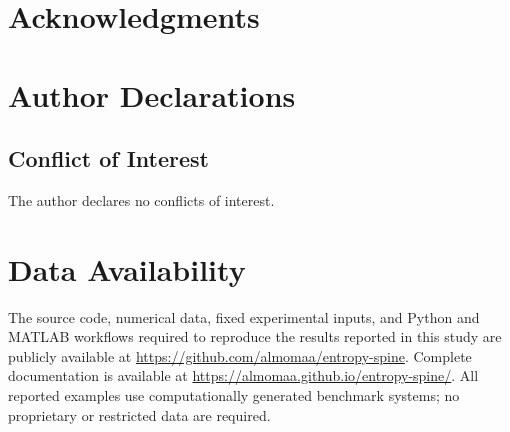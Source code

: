 \documentclass[aip,cha,reprint,superscriptaddress,floatfix]{revtex4-2}
\theoremstyle{definition}
\theoremstyle{remark}
\begin{document}
\section*{Acknowledgments}

\section*{Author Declarations}

\subsection*{Conflict of Interest}
The author declares no conflicts of interest.


\section*{Data Availability}
The source code, numerical data, fixed experimental inputs, and Python and MATLAB workflows required to reproduce the results reported in this study are publicly available at \url{https://github.com/almomaa/entropy-spine}. Complete documentation is available at \url{https://almomaa.github.io/entropy-spine/}. All reported examples use computationally generated benchmark systems; no proprietary or restricted data are required.


\end{document}
